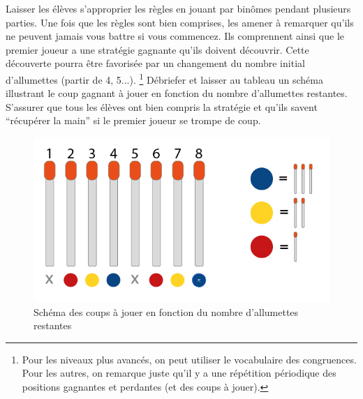 \documentclass[a4paper,12pt]{article}
\begin{document}
Laisser les élèves s'approprier les règles en jouant par binômes pendant plusieurs parties. Une fois que les règles sont bien comprises, les amener à remarquer qu'ils ne peuvent jamais vous battre si vous commencez. Ils comprennent ainsi que le premier joueur a une stratégie gagnante qu'ils doivent découvrir. Cette découverte pourra être favorisée par un changement du nombre initial d'allumettes (partir de 4, 5...).  \footnote{Pour les niveaux plus avancés, on peut utiliser le vocabulaire des congruences. Pour les autres, on remarque juste qu'il y a une répétition périodique des positions gagnantes et perdantes (et des coups à jouer).}
%
Débriefer et laisser au tableau un schéma illustrant le coup gagnant à jouer en fonction du nombre d'allumettes restantes. S'assurer que tous les élèves ont bien compris la stratégie et qu'ils savent ``récupérer la main'' si le premier joueur se trompe de coup.

\begin{figure}[h!]
\centering
\includegraphics[scale = 0.4]{./Images/fig2-v3.png}
\caption{Schéma des coups à jouer en fonction du nombre d'allumettes restantes}
\label{fig:schemStrategie}
\end{figure}
\end{document}
